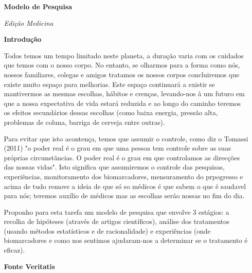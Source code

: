 \documentclass[12pt]{article}
\begin{document}
 

\begin{titlepage}
    \begin{center}
        \Huge\textbf{Modelo de Pesquisa}
         
        \Large\textit{Edi\c c\~ao Medicina}
         
        \vspace{10cm}
    \end{center}
\end{titlepage}

\begin{center}
    \Huge\textbf{Introdu\c c\~ao}
\end{center}

\justifying
Todos temos um tempo limitado neste planeta, a dura\c c\~ao varia com os
cuidados que temos com o nosso corpo. No entanto, se olharmos para a forma como
n\'os, nossos familiares, colegas e amigos tratamos os nossos corpos
concluiremos que existe muito espa\c co para melhorias. Este espa\c co
continuar\'a a existir se mantivermos as mesmas escolhas, h\'abitos e cren\c
cas,  levando-nos \`a um futuro em que a nossa expectativa de vida estar\'a
reduzida e ao longo do caminho teremos os efeitos secund\'arios dessas escolhas
(como baixa energia, press\~ao alta, problemas de coluna, barriga de cerveja
entre outras).

Para evitar que isto aconten\c ca,  temos que assumir o controle, como diz o
Tomassi (2011) "o poder real \'e o grau em que uma pessoa tem controle sobre as
suas pr\'oprias circunst\~ancias. O poder real \'e o grau em que controlamos as
direc\c c\~oes das nossas vidas". Isto significa que assumiremos o controle das
pesquisas, experi\~encias, monitoramento dos biomarcadores, mensuramento do
prpogresso e acima de tudo remove a ideia de que s\'o so m\'edicos \'e que
sabem o que \'e saudavel para n\'os; teremos aux\'ilio de m\'edicos mas as
escolhas ser\~ao nossas no fim do dia. 

Proponho para esta tarefa um modelo de pesquisa que envolve 3 est\'agios: a
recolha de hip\'oteses (atrav\'es de artigos cient\'ificos), an\'alise dos
tratamentos (usando m\'etodos estat\'isticos e de racionalidade) e
experi\^encias (onde biomarcadores e como nos sentimos ajudaram-nos a
determinar se o tratamento \'e eficaz). 
\pagebreak


\begin{center}
    \Huge\textbf{Fonte Veritatis}
\end{center}
\end{document}

